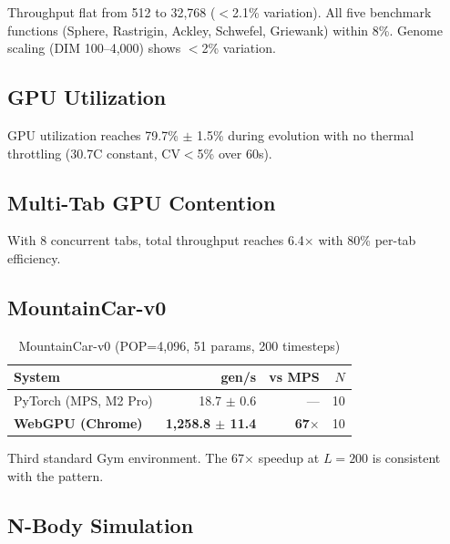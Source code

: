 \documentclass[sigconf,nonacm]{acmart}
\begin{document}
Throughput flat from 512 to 32,768 ($<$2.1\% variation). All five benchmark functions (Sphere, Rastrigin, Ackley, Schwefel, Griewank) within 8\%. Genome scaling (DIM 100--4,000) shows $<$2\% variation.

\subsection{GPU Utilization}

GPU utilization reaches 79.7\% $\pm$ 1.5\% during evolution with no thermal throttling (30.7\textdegree C constant, CV$<$5\% over 60s).

\subsection{Multi-Tab GPU Contention}

With 8 concurrent tabs, total throughput reaches 6.4$\times$ with 80\% per-tab efficiency.

\subsection{MountainCar-v0}

\begin{table}[h]
\caption{MountainCar-v0 (POP=4,096, 51 params, 200 timesteps)}
\label{tab:mountaincar}
\begin{tabular}{lrrr}
\toprule
System & gen/s & vs MPS & $N$ \\
\midrule
PyTorch (MPS, M2 Pro) & 18.7 $\pm$ 0.6 & --- & 10 \\
\textbf{WebGPU (Chrome)} & \textbf{1,258.8 $\pm$ 11.4} & \textbf{67$\times$} & 10 \\
\bottomrule
\end{tabular}
\end{table}

Third standard Gym environment. The 67$\times$ speedup at $L=200$ is consistent with the pattern.

\subsection{N-Body Simulation}

\begin{table}[h]
\caption{N-Body (512 bodies, 200 timesteps, $O(N^2)$ force, sequential)}
\label{tab:nbody}
\end{table}
\end{document}

